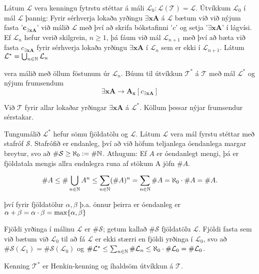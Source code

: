 \documentclass[12pt]{book}
\newcommand{\cT}{\mathcal{T}}
\newcommand{\cL}{\mathcal{L}}
\newcommand{\cS}{\mathcal{S}}
\newcommand{\bA}{\mathbf{A}}
\newcommand{\bc}{\mathbf{c}}
\newcommand{\bx}{\mathbf{x}}
\begin{document}
Látum $\cL$ vera kenningu fytrstu stéttar á máli $\cL_0: \cL(\cT) = \cL$.
Útvíkkum $\cL_0$ í mál $\cL$ þannig: Fyrir sérhverja lokaða yrðingu
$\exists \bx \bA$ á $\cL$ bætum við við nýjum fasta '$\bc_{\exists \bx \bA}$'
við málið $\cL$ með því að skrifa bókstafinni '$c$' og setja '${\exists \bx \bA}$'
í lágvísi. Ef $\cL_n$ hefur verið skilgrein, $n \geq 1$, þá fáum við mál $\cL_{n+1}$
með því að bæta við fasta $c_{\exists \bx \bA}$ fyrir sérhverja lokaða yrðingu
$\exists \bx \bA$ í $\cL_n$ sem er ekki í $\cL_{n+1}$. Látum $\cL^* = \bigcup_{n \in \N} \cL_n$

vera málið með öllum föstunum úr $\cL_n$. Búum til útvíkkun $\cT^*$ á $\cT$ með
mál $\cL^*$ og nýjum frumsendum 
\[ \exists \bx \bA \to \bA_{\bx}[c_{\exists \bx \bA}]\]

Við $\cT$ fyrir allar lokaðar yrðingar $\exists \bx \bA$ á $\cL^*$. Köllum
þessar nýjar frumsendur sérstakar.

\begin{ath}
  Tungumálið $\cL^*$ hefur sömu fjöldatölu og $\cL$. Látum $\cL$ vera mál
fyrstu stéttar með stafróf $\cS$. Stafrófið er endanleg, því að við höfum teljanlega óendanlega
margar breytur, svo að $\#\cS \geq \aleph_0 := \# \N$. Athugum: Ef $A$ er 
óendanlegt mengi, þá er fjöldatala mengis allra endnlegra runa af stökum A jöfn $\# A$.

\[ \# A \leq \# \bigcup_{n \in \mathbb{N}} A^n \leq \sum_{n \in \mathbb{N}} ( \# A)^n = \sum_{n \in \mathbb{N}} \#A = \aleph_0 \cdot \# A = \# A.\]

því fyrir fjöldatölur $\alpha, \beta$ þ.a. önnur þeirra er óendanleg er $\alpha + \beta = \alpha \cdot \beta = \max \{\alpha,\beta\}$
\end{ath}

Fjöldi yrðinga í málinu $\cL$ er $\# \cS$; getum kallað $\# \cS$ fjöldatölu $\cL$.
Fjöldi fasta sem við bætum við $\cL_0$ til að fá $\cL$ er ekki stærri en fjöldi
yrðinga í $\cL_0$, svo að $\# \cS (\cL_1) = \# \cS (\cL_0)$ og
$\# \cL^* \leq \sum_{n \in \N} \# \cL_n \leq \aleph_0 \cdot \# \cL_0 = \# \cL_0$.

\begin{setn}
 Kenning $\cT^*$ er Henkin-kenning og íhaldsöm útvíkkun á $\cT$. 
\end{setn}
\end{document}
